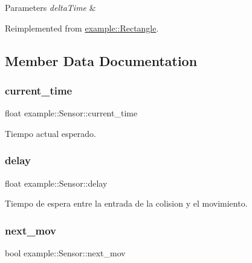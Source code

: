 \begin{DoxyParams}{Parameters}
{\em delta\+Time} & \\
\hline
\end{DoxyParams}


Reimplemented from \mbox{\hyperlink{classexample_1_1_rectangle_a346951183565830ee4b262c8c66f2673}{example\+::\+Rectangle}}.



\subsection{Member Data Documentation}
\mbox{\label{classexample_1_1_sensor_aadf52308777810c4f22a96992ae6467c}} 
\subsubsection{\texorpdfstring{current\_time}{current\_time}}
{\footnotesize\ttfamily float example\+::\+Sensor\+::current\+\_\+time\hspace{0.3cm}{\ttfamily [protected]}}



Tiempo actual esperado. 

\mbox{\label{classexample_1_1_sensor_ac2e45c749b3c91d09da0aacd8b24db89}} 
\subsubsection{\texorpdfstring{delay}{delay}}
{\footnotesize\ttfamily float example\+::\+Sensor\+::delay\hspace{0.3cm}{\ttfamily [protected]}}



Tiempo de espera entre la entrada de la colision y el movimiento. 

\mbox{\label{classexample_1_1_sensor_aa31ff020f203760129a64b931d844aed}} 
\subsubsection{\texorpdfstring{next\_mov}{next\_mov}}
{\footnotesize\ttfamily bool example\+::\+Sensor\+::next\+\_\+mov\hspace{0.3cm}{\ttfamily [protected]}}



